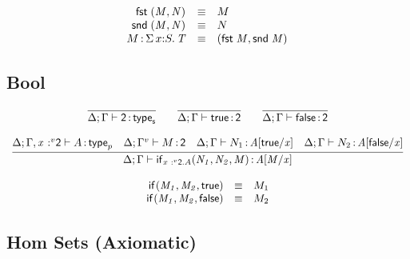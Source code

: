 \documentclass[11pt]{article}
\theoremstyle{plain}
\begin{document}
\[
\begin{array}{rcll}
\mathit{\mathsf{fst}_{} \: \mathit{(M,N)_{}}} & \equiv & M \\
\mathit{\mathsf{snd}_{} \: \mathit{(M,N)_{}}} & \equiv & N \\
M \, \mathit{:} \, \textnormal{$\Sigma$}\,x \mathit{:} S.\,\mathit{T} & \equiv & \mathit{(\mathit{\mathsf{fst}_{} \: M},\mathit{\mathsf{snd}_{} \: M})_{}}
\end{array}
\]

\subsection{Bool}

\[
\begin{array}{c}
\infer{\wftpsf{\Delta}{\Gamma}{\dsd{2}}}
      {}
\qquad
\infer{\oftpsf{\Delta}{\Gamma}{\dsd{true}}{\dsd{2}}}{}
\qquad
\infer{\oftpsf{\Delta}{\Gamma}{\dsd{false}}{\dsd{2}}}{}
\\ \\
\infer{\oftpp{\Delta}{\Gamma}{\ite{\vstptm{x}{v}{\dsd{2}}.A}{N_1}{N_2}{M}}{\subst{A}{M}{x}}}
      {\wftpp{\Delta}{\Gamma,\vstptm{x}{v}{\dsd{2}}}{A} &
        \oftpsf{\Delta}{\Gamma^v}{M}{\dsd{2}} &
        \oftpp{\Delta}{\Gamma}{N_1}{\subst{A}{\dsd{true}}{x}} &
        \oftpp{\Delta}{\Gamma}{N_2}{\subst{A}{\dsd{false}}{x}}
      }
\\ \\
\begin{array}{rcll}
\ite{}{M_1}{M_2}{\dsd{true}} & \equiv & M_1 \\
\ite{}{M_1}{M_2}{\dsd{false}} & \equiv & M_2 \\
\end{array} \\
\end{array}
\]



\subsection{Hom Sets (Axiomatic)}
\end{document}

